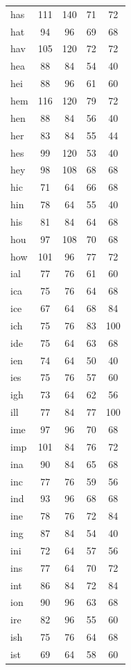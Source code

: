 \documentclass[ms,electronic,twosidetoc,letterpaper,chaptercenter,parttop,lof,lot]{byumsphd}
\begin{document}
\begin{table}
\begin{tabular}{| l | c c | c c |}
  has & 111 & 140 & 71 & 72 \\
  hat & 94 & 96 & 69 & 68 \\
  hav & 105 & 120 & 72 & 72 \\
  hea & 88 & 84 & 54 & 40 \\
  hei & 88 & 96 & 61 & 60 \\
  hem & 116 & 120 & 79 & 72 \\
  hen & 88 & 84 & 56 & 40 \\
  her & 83 & 84 & 55 & 44 \\
  hes & 99 & 120 & 53 & 40 \\
  hey & 98 & 108 & 68 & 68 \\
  hic & 71 & 64 & 66 & 68 \\
  hin & 78 & 64 & 55 & 40 \\
  his & 81 & 84 & 64 & 68 \\
  hou & 97 & 108 & 70 & 68 \\
  how & 101 & 96 & 77 & 72 \\
  ial & 77 & 76 & 61 & 60 \\
  ica & 75 & 76 & 64 & 68 \\
  ice & 67 & 64 & 68 & 84 \\
  ich & 75 & 76 & 83 & 100 \\
  ide & 75 & 64 & 63 & 68 \\
  ien & 74 & 64 & 50 & 40 \\
  ies & 75 & 76 & 57 & 60 \\
  igh & 73 & 64 & 62 & 56 \\
  ill & 77 & 84 & 77 & 100 \\
  ime & 97 & 96 & 70 & 68 \\
  imp & 101 & 84 & 76 & 72 \\
  ina & 90 & 84 & 65 & 68 \\
  inc & 77 & 76 & 59 & 56 \\
  ind & 93 & 96 & 68 & 68 \\
  ine & 78 & 76 & 72 & 84 \\
  ing & 87 & 84 & 54 & 40 \\
  ini & 72 & 64 & 57 & 56 \\
  ins & 77 & 64 & 70 & 72 \\
  int & 86 & 84 & 72 & 84 \\
  ion & 90 & 96 & 63 & 68 \\
  ire & 82 & 96 & 55 & 60 \\
  ish & 75 & 76 & 64 & 68 \\
  ist & 69 & 64 & 58 & 60 \\

\end{tabular}
\end{table}
\end{document}
